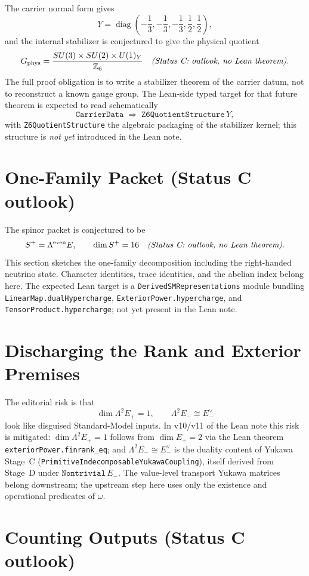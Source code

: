 \documentclass[11pt,a4paper]{article}
\begin{document}
The carrier normal form gives
\[
Y=\operatorname{diag}\left(-\frac13,-\frac13,-\frac13,\frac12,\frac12\right),
\]
and the internal stabilizer is conjectured to give the physical quotient
\[
G_{\mathrm{phys}}
=
\frac{SU(3)\times SU(2)\times U(1)_Y}{\mathbb Z_6}
\quad\text{\emph{(Status C: outlook, no Lean theorem)}}.
\]
The full proof obligation is to write a stabilizer theorem of the carrier datum, not to
reconstruct a known gauge group. The Lean-side typed target for that future theorem is expected
to read schematically
\[
\texttt{CarrierData}
\;\Rightarrow\;
\texttt{Z6QuotientStructure}\,Y,
\]
with \texttt{Z6QuotientStructure} the algebraic packaging of the stabilizer kernel; this
structure is \emph{not yet} introduced in the Lean note.

\section{One-Family Packet (Status C outlook)}
\label{sec:packet-outlook}

The spinor packet is conjectured to be
\[
S^+=\Lambda^{\mathrm{even}}E,
\qquad
\dim S^+=16
\quad\text{\emph{(Status C: outlook, no Lean theorem)}}.
\]
This section sketches the one-family decomposition including the right-handed neutrino state.
Character identities, trace identities, and the abelian index belong here. The expected Lean
target is a \texttt{DerivedSMRepresentations} module bundling
\texttt{LinearMap.dualHypercharge}, \texttt{ExteriorPower.hypercharge}, and
\texttt{TensorProduct.hypercharge}; not yet present in the Lean note.

\section{Discharging the Rank and Exterior Premises}

The editorial risk is that
\[
\dim \Lambda^2E_+=1,
\qquad
\Lambda^2E_-\cong E_-^\vee
\]
look like disguised Standard-Model inputs. In v10/v11 of the Lean note this risk is mitigated:
$\dim \Lambda^2 E_+ = 1$ follows from $\dim E_+ = 2$ via the Lean theorem
\texttt{exteriorPower.finrank\_eq}; and $\Lambda^2 E_- \cong E_-^\vee$ is the duality content of
Yukawa Stage~C (\texttt{PrimitiveIndecomposableYukawaCoupling}), itself derived from Stage~D under
$\texttt{Nontrivial}\,E_-$. The value-level transport Yukawa matrices belong downstream; the
upstream step here uses only the existence and operational predicates of $\omega$.

\section{Counting Outputs (Status C outlook)}
\label{sec:counting-outlook}
\end{document}
